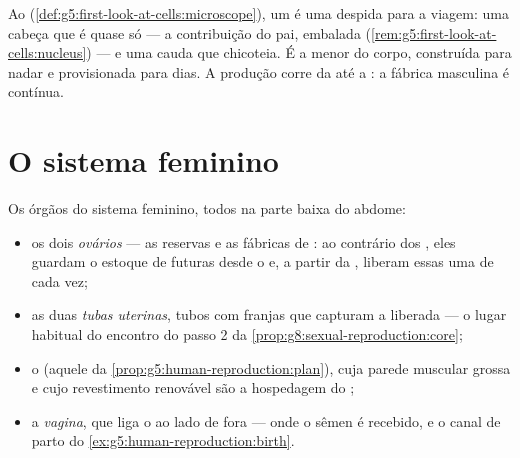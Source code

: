 \begin{example}\label{ex:g8:reproductive-systems:sperm}
Ao  (\cref{def:g5:first-look-at-cells:microscope}), um
 é uma  despida para a viagem: uma cabeça que é
quase só  --- a contribuição do pai, embalada
(\cref{rem:g5:first-look-at-cells:nucleus}) --- e uma cauda que chicoteia.
É a menor  do corpo, construída para nadar e provisionada para
dias. A produção corre da  até a : a fábrica masculina
é contínua.
\end{example}

\section{O sistema feminino}

\begin{definition}\label{def:g8:reproductive-systems:female}
Os órgãos do sistema feminino, todos na parte baixa do abdome:
\begin{itemize}
  \item os dois \emph{ovários} --- as reservas e as
        fábricas de : ao contrário dos , eles guardam
        o estoque de futuras \emph{}
        desde o  e, a partir da , liberam essas
         uma de cada vez;
  \item as duas \emph{tubas uterinas}, tubos com
        franjas que capturam a  liberada --- o lugar habitual do
        encontro do passo 2 da
        \cref{prop:g8:sexual-reproduction:core};
  \item o \emph{} (aquele da
        \cref{prop:g5:human-reproduction:plan}), cuja parede muscular
        grossa e cujo revestimento renovável são a hospedagem do
        ;
  \item a \emph{vagina}, que liga o  ao lado de fora --- onde o
        sêmen é recebido, e o canal de parto do
        \cref{ex:g5:human-reproduction:birth}.
\end{itemize}
\end{definition}

